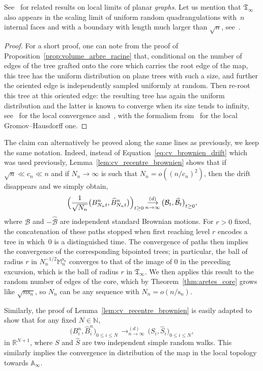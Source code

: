 \documentclass[10pt]{amsart}
\theoremstyle{plain}
\theoremstyle{definition}
\theoremstyle{remark}
\newcommand{\N}{\mathbb{N}}
\newcommand{\R}{\mathbb{R}}
\newcommand{\Tree}{\mathfrak{T}}
\newcommand{\Mapb}{\mathbb{M}}
\newcommand{\spar}{\mathrm{s}}
\newcommand{\cvloi}[1][n]{\,\mathop{\longrightarrow}^{(d)}_{#1 \to \infty}\,}
\begin{document}
See~\cite{KM21a} for related results on local limits of planar \emph{graphs}.
Let us mention that $\Tree_\infty$ also appears in the scaling limit of uniform random quadrangulations with~$n$ internal faces and with a boundary with length much larger than $\sqrt{n}$, see~\cite[Th.\,3.4]{BMR19}.

\begin{proof}
For a short proof, one can note from the proof of Proposition~\ref{prop:volume_arbre_racine} that, conditional on the number of edges of the tree grafted onto the core which carries the root edge of the map, this tree has the uniform distribution on plane trees with such a size, and further the oriented edge is independently sampled uniformly at random. Then re-root this tree at this oriented edge: the resulting tree has again the uniform distribution and the latter is known to converge when its size tends to infinity, see~\cite[Th.\,7.1]{Jan12} for the local convergence and~\cite[\S 2.5]{Ald91c}, with the formalism from~\cite{DLG05} for the local Gromov--Hausdorff one.
\end{proof}

The claim can alternatively be proved along the same lines as previously, we keep the same notation.
Indeed, instead of Equation~\eqref{eq:cv_brownien_drift} which was used previously, Lemma~\ref{lem:cv_recentre_brownien} shows that if $\sqrt{n} \ll c_n \ll n$ and if $N_{n} \to \infty$ is such that $N_{n} = o((n/c_{n})^2)$, then the drift disappears and we simply obtain,
\[
\Bigl(\frac{1}{\sqrt{N_{n}}} \bigl(B^{n}_{N_{n}t}, \widehat{B}^{n}_{N_{n}t}\bigr)\Bigl)_{t \ge 0}
\cvloi \bigl(\mathcal{B}_{t}, \widehat{\mathcal{B}}_{t}\bigr)_{t \ge 0},
\]
where $\mathcal{B}$ and $-\widehat{\mathcal{B}}$ are independent standard Brownian motions.
For $r>0$ fixed, the concatenation of these paths stopped when first reaching level $r$ encodes a tree in which~$0$ is a distinguished time.
The convergence of paths then implies the convergence of the corresponding bipointed trees; in particular, the ball of radius $r$ in $N_n^{-1/2} \Mapb_n^{\spar_n}$ converges to that of the image of $0$ in the preceding excursion, which is the ball of radius $r$ in $\Tree_\infty$.
We then applies this result to the random number of edges of the core, which by Theorem~\ref{thm:aretes_core} grows like $\sqrt{n\spar_n}$, so $N_n$ can be any sequence with $N_n = o(n/\spar_n)$.

Similarly, the proof of Lemma~\ref{lem:cv_recentre_brownien} is easily adapted to show that
for any fixed $N \in \N$,
\[
\big(B^{n}_{i}, \widehat{B}^{n}_{i}\big)_{0 \le i \le N} \cvloi \big(S_{i}, \widehat{S}_{i}\big)_{0 \le i \le N},
\]
in $\R^{N+1}$, where $S$ and $\widehat{S}$ are two independent simple random walks.
This similarly implies the convergence in distribution of the map in the local topology towards $\mathbb{A}_\infty$.
\end{document}
